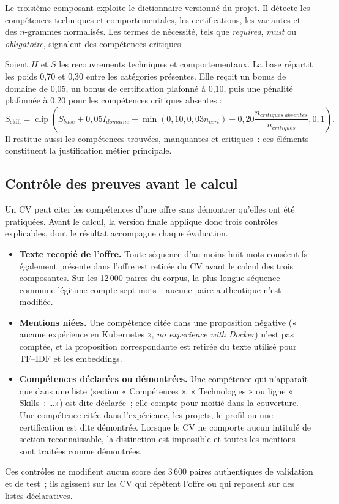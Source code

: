Le troisième composant exploite le dictionnaire versionné du projet. Il détecte les compétences techniques et comportementales, les certifications, les variantes et des $n$-grammes normalisés. Les termes de nécessité, tels que \emph{required}, \emph{must} ou \emph{obligatoire}, signalent des compétences critiques.

Soient $H$ et $S$ les recouvrements techniques et comportementaux. La base répartit les poids 0,70 et 0,30 entre les catégories présentes. Elle reçoit un bonus de domaine de 0,05, un bonus de certification plafonné à 0,10, puis une pénalité plafonnée à 0,20 pour les compétences critiques absentes :
\[
 S_{\mathrm{skill}}=\operatorname{clip}\left(S_{base}+0{,}05I_{domaine}+\min(0{,}10,0{,}03n_{cert})-0{,}20\frac{n_{critiques\ absentes}}{n_{critiques}},0,1\right).
\]
Il restitue aussi les compétences trouvées, manquantes et critiques~: ces éléments constituent la justification métier principale.

\subsection{Contrôle des preuves avant le calcul}

Un CV peut citer les compétences d'une offre sans démontrer qu'elles ont été pratiquées. Avant le calcul, la version finale applique donc trois contrôles explicables, dont le résultat accompagne chaque évaluation.
\begin{itemize}
  \item \textbf{Texte recopié de l'offre.} Toute séquence d'au moins huit mots consécutifs également présente dans l'offre est retirée du CV avant le calcul des trois composantes. Sur les 12\,000 paires du corpus, la plus longue séquence commune légitime compte sept mots~: aucune paire authentique n'est modifiée.
  \item \textbf{Mentions niées.} Une compétence citée dans une proposition négative (« aucune expérience en Kubernetes », \emph{no experience with Docker}) n'est pas comptée, et la proposition correspondante est retirée du texte utilisé pour TF--IDF et les embeddings.
  \item \textbf{Compétences déclarées ou démontrées.} Une compétence qui n'apparaît que dans une liste (section « Compétences », « Technologies » ou ligne « Skills~: \ldots ») est dite déclarée~; elle compte pour moitié dans la couverture. Une compétence citée dans l'expérience, les projets, le profil ou une certification est dite démontrée. Lorsque le CV ne comporte aucun intitulé de section reconnaissable, la distinction est impossible et toutes les mentions sont traitées comme démontrées.
\end{itemize}
Ces contrôles ne modifient aucun score des 3\,600 paires authentiques de validation et de test~; ils agissent sur les CV qui répètent l'offre ou qui reposent sur des listes déclaratives.

